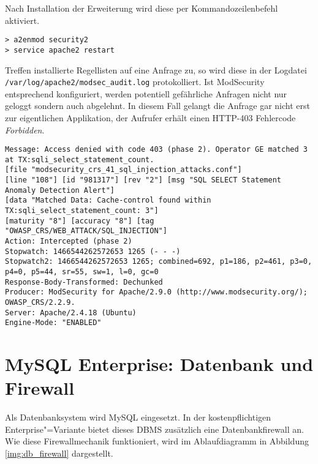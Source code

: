 Nach Installation der Erweiterung wird diese per Kommandozeilenbefehl aktiviert.

\begin{listing}[ht!]
\begin{verbatim}
> a2enmod security2
> service apache2 restart
\end{verbatim}
\end{listing}


Treffen installierte Regellisten auf eine Anfrage zu, so wird diese in der Logdatei \texttt{/var/log/apache2/modsec\_audit.log} protokolliert. Ist ModSecurity entsprechend konfiguriert, werden potentiell gefährliche Anfragen nicht nur geloggt sondern auch abgelehnt. In diesem Fall gelangt die Anfrage gar nicht erst zur eigentlichen Applikation, der Aufrufer erhält einen HTTP-403 Fehlercode \emph{Forbidden}.

\begin{listing}[ht!]

\begin{verbatim}
Message: Access denied with code 403 (phase 2). Operator GE matched 3 at TX:sqli_select_statement_count.
[file "modsecurity_crs_41_sql_injection_attacks.conf"]
[line "108"] [id "981317"] [rev "2"] [msg "SQL SELECT Statement Anomaly Detection Alert"]
[data "Matched Data: Cache-control found within TX:sqli_select_statement_count: 3"]
[maturity "8"] [accuracy "8"] [tag "OWASP_CRS/WEB_ATTACK/SQL_INJECTION"]
Action: Intercepted (phase 2)
Stopwatch: 1466544262572653 1265 (- - -)
Stopwatch2: 1466544262572653 1265; combined=692, p1=186, p2=461, p3=0, p4=0, p5=44, sr=55, sw=1, l=0, gc=0
Response-Body-Transformed: Dechunked
Producer: ModSecurity for Apache/2.9.0 (http://www.modsecurity.org/); OWASP_CRS/2.2.9.
Server: Apache/2.4.18 (Ubuntu)
Engine-Mode: "ENABLED"
\end{verbatim}
\end{listing}



\section{MySQL Enterprise: Datenbank und Firewall}

Als Datenbanksystem wird MySQL eingesetzt. In der kostenpflichtigen Enterprise"=Variante bietet dieses DBMS zusätzlich eine Datenbankfirewall an. Wie diese Firewallmechanik funktioniert, wird im Ablaufdiagramm in Abbildung \ref{img:db_firewall} dargestellt.

